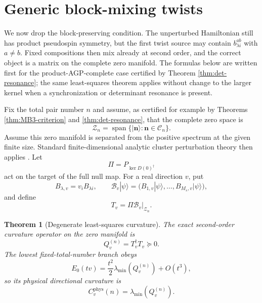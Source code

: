 \documentclass[11pt]{article}
\numberwithin{equation}{section}
\newtheorem{theorem}{Theorem}[section]
\newcommand{\cZ}{\mathcal Z}
\newcommand{\cC}{\mathcal C}
\newcommand{\cB}{\mathcal B}
\newcommand{\bn}{\mathbf n}
\newcommand{\Span}{\operatorname{span}}
\begin{document}
\section{Generic block-mixing twists}

We now drop the block-preserving condition.  The unperturbed Hamiltonian still has product pseudospin symmetry, but the first twist source may contain $b_{\lambda i}^{ab}$ with $a\ne b$.  Fixed compositions then mix already at second order, and the correct object is a matrix on the complete zero manifold.  The formulas below are written first for the product-AGP-complete case certified by Theorem \ref{thm:det-resonance}; the same least-squares theorem applies without change to the larger kernel when a synchronization or determinant resonance is present.

Fix the total pair number $n$ and assume, as certified for example by Theorems \ref{thm:MB3-criterion} and \ref{thm:det-resonance}, that the complete zero space is
\begin{equation}
 \cZ_n=\Span\{|\bn\rangle:\bn\in\cC_n\}.
 \label{eq:Zn}
\end{equation}
Assume this zero manifold is separated from the positive spectrum at the given finite size.  Standard finite-dimensional analytic cluster perturbation theory then applies \cite{Kato1976}.  Let
\begin{equation}
 \Pi=P_{\ker D(0)^\dagger}
 \label{eq:global-Pi}
\end{equation}
act on the target of the full null map.  For a real direction $v$, put
\begin{equation}
 B_{\lambda,v}=v_iB_{\lambda i},
 \qquad
 \cB_v|\psi\rangle
 =\bigl(B_{1,v}|\psi\rangle,\ldots,B_{M_s,v}|\psi\rangle\bigr),
 \label{eq:B-map}
\end{equation}
and define
\begin{equation}
 T_v=\Pi\cB_v\big|_{\cZ_n}.
 \label{eq:T-v}
\end{equation}

\begin{theorem}[Degenerate least-squares curvature]
\label{thm:degenerate-LS}
The exact second-order curvature operator on the zero manifold is
\begin{equation}
 \boxed{Q_v^{(n)}=T_v^\dagger T_v\succeq0.}
 \label{eq:Q-def}
\end{equation}
The lowest fixed-total-number branch obeys
\begin{equation}
 E_0(tv)
 =\frac{t^2}{2}\lambda_{\min}(Q_v^{(n)})+O(t^3),
 \label{eq:E-Q}
\end{equation}
so its physical directional curvature is
\begin{equation}
 \boxed{C_v^{\mathrm{phys}}(n)=\lambda_{\min}(Q_v^{(n)}).}
 \label{eq:C-lambda-min}
\end{equation}
\end{theorem}
\end{document}
